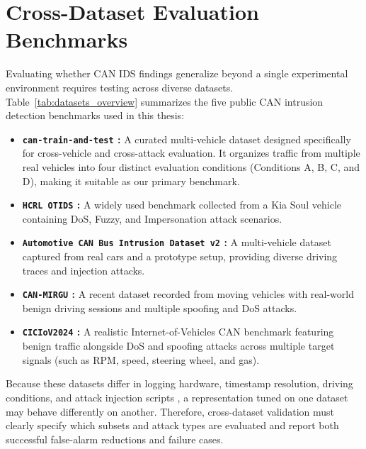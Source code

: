 \documentclass[12pt, a4paper, reqno, oneside]{book}
\begin{document}
\section{Cross-Dataset Evaluation Benchmarks}
\label{subsec:cross_dataset}

Evaluating whether CAN IDS findings generalize beyond a single experimental environment requires testing across diverse datasets. Table~\ref{tab:datasets_overview} summarizes the five public CAN intrusion detection benchmarks used in this thesis:
\begin{itemize}
    \item \textbf{\texttt{can-train-and-test} \cite{lampe2023cantrain, lampe2024curated}:} A curated multi-vehicle dataset designed specifically for cross-vehicle and cross-attack evaluation. It organizes traffic from multiple real vehicles into four distinct evaluation conditions (Conditions A, B, C, and D), making it suitable as our primary benchmark.
    \item \textbf{\texttt{HCRL OTIDS} \cite{lee2017otids}:} A widely used benchmark collected from a Kia Soul vehicle containing DoS, Fuzzy, and Impersonation attack scenarios.
    \item \textbf{\texttt{Automotive CAN Bus Intrusion Dataset v2} \cite{dupont2019automotive}:} A multi-vehicle dataset captured from real cars and a prototype setup, providing diverse driving traces and injection attacks.
    \item \textbf{\texttt{CAN-MIRGU} \cite{rajapaksha2024canmirgu}:} A recent dataset recorded from moving vehicles with real-world benign driving sessions and multiple spoofing and DoS attacks.
    \item \textbf{\texttt{CICIoV2024} \cite{neto2024ciciov2024}:} A realistic Internet-of-Vehicles CAN benchmark featuring benign traffic alongside DoS and spoofing attacks across multiple target signals (such as RPM, speed, steering wheel, and gas).
\end{itemize}

Because these datasets differ in logging hardware, timestamp resolution, driving conditions, and attack injection scripts \cite{dupont2019automotive, lampe2024curated, rajapaksha2024canmirgu}, a representation tuned on one dataset may behave differently on another. Therefore, cross-dataset validation must clearly specify which subsets and attack types are evaluated and report both successful false-alarm reductions and failure cases.
\end{document}
